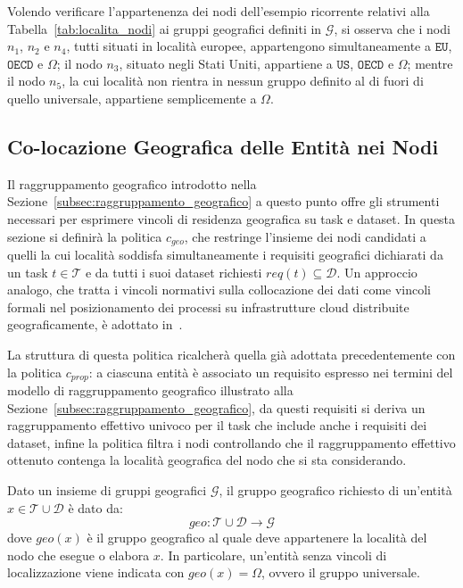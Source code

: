 Volendo verificare l'appartenenza dei nodi dell'esempio ricorrente relativi alla Tabella~\ref{tab:localita_nodi} ai gruppi geografici definiti in $\mathcal{G}$, si osserva che i nodi $n_1$, $n_2$ e $n_4$, tutti situati in località europee, appartengono simultaneamente a $\mathtt{EU}$, $\mathtt{OECD}$ e $\Omega$; il nodo $n_3$, situato negli Stati Uniti, appartiene a $\mathtt{US}$, $\mathtt{OECD}$ e $\Omega$; mentre il nodo $n_5$, la cui località non rientra in nessun gruppo definito al di fuori di quello universale, appartiene semplicemente a $\Omega$.


\subsection{Co-locazione Geografica delle Entità nei Nodi}
\label{subsec:politica_geo}

Il raggruppamento geografico introdotto nella Sezione~\ref{subsec:raggruppamento_geografico} a questo punto offre gli strumenti necessari per esprimere vincoli di residenza geografica su task e dataset. In questa sezione si definirà la politica $c_{geo}$, che restringe l'insieme dei nodi candidati a quelli la cui località soddisfa simultaneamente i requisiti geografici dichiarati da un task $t \in \mathcal{T}$ e da tutti i suoi dataset richiesti $req(t) \subseteq \mathcal{D}$. Un approccio analogo, che tratta i vincoli normativi sulla collocazione dei dati come vincoli formali nel posizionamento dei processi su infrastrutture cloud distribuite geograficamente, è adottato in~\cite{privacy-regulation-aware-process-mapping}.

La struttura di questa politica ricalcherà quella già adottata precedentemente con la politica $c_{prop}$: a ciascuna entità è associato un requisito espresso nei termini del modello di raggruppamento geografico illustrato alla Sezione~\ref{subsec:raggruppamento_geografico}, da questi requisiti si deriva un raggruppamento effettivo univoco per il task che include anche i requisiti dei dataset, infine la politica filtra i nodi controllando che il raggruppamento effettivo ottenuto contenga la località geografica del nodo che si sta considerando.

\begin{definition}
    \label{def:requisito_geografico}
    Dato un insieme di gruppi geografici $\mathcal{G}$, il gruppo geografico richiesto di un'entità $x \in \mathcal{T} \cup \mathcal{D}$ è dato da:
    \begin{equation}
        geo : \mathcal{T} \cup \mathcal{D} \rightarrow \mathcal{G}
    \end{equation}
    dove $geo(x)$ è il gruppo geografico al quale deve appartenere la località del nodo che esegue o elabora $x$. In particolare, un'entità senza vincoli di localizzazione viene indicata con $geo(x) = \Omega$, ovvero il gruppo universale. 
\end{definition}

